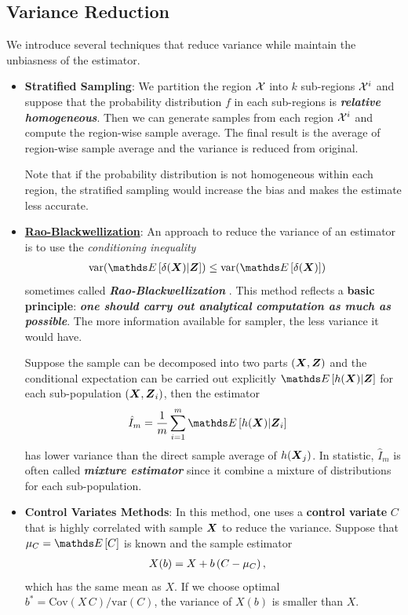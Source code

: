 \documentclass[11pt]{article}
\begin{document}
\subsection{Variance Reduction}
We introduce several techniques that reduce variance while maintain the unbiasness of the estimator.
\begin{itemize}
\item \textbf{Stratified Sampling}: We partition the region ${\mathcal X}$ into $k$ sub-regions ${\mathcal X}^{i}$ and suppose that the probability distribution $f$ in each sub-regions is \emph{\textbf{relative homogeneous}}. Then we can generate samples from each region ${\mathcal X}^{i}$ and compute the region-wise sample average. The final result is the average of region-wise sample average and the variance is reduced from original. 

Note that if the probability distribution is not homogeneous within each region, the stratified sampling would increase the bias and makes the estimate less accurate.

\item \underline{\textbf{Rao-Blackwellization}}: An approach to reduce the variance of an estimator is to use the \emph{conditioning inequality}
\begin{align}
\text{var}(\E{}{\delta(\mb{X})|\mb{Z}}) &\le \text{var}(\E{}{\delta(\mb{X})}) \label{eqn: rao_blackwell}
\end{align} sometimes called \textbf{\emph{Rao-Blackwellization}} \citep{liu2001monte}. This method reflects a \textbf{basic principle}: \emph{\textbf{one should carry out analytical computation as much as possible}}. The more information available for sampler, the less variance it would have. 

Suppose the sample can be decomposed into two parts $(\boldsymbol{X}, \boldsymbol{Z})$ and the conditional expectation can be carried out explicitly $\E{}{h(\mb{X}) | \mb{Z}}$ for each sub-population $(\boldsymbol{X}, \boldsymbol{Z}_i)$, then the estimator 
\begin{align*}
\hat{I}_{m} &= \frac{1}{m}\sum_{i=1}^{m}\E{}{h(\mb{X}) | \mb{Z}_{i}}
\end{align*} has lower variance than the direct sample average of $h(\boldsymbol{X}_{j})$. In statistic, $\hat{I}_{m}$ is often called \emph{\textbf{mixture estimator}} since it combine a mixture of distributions for each sub-population.

\item \textbf{Control Variates Methods}: In this method, one uses a \textbf{control variate} $C$ that is highly correlated with sample $\boldsymbol{X}$ to reduce the variance. Suppose that $\mu_{C} = \E{}{C}$ is known and the sample estimator
\begin{align*}
X(b) &= X + b\left(C - \mu_{C}\right),
\end{align*} which has the same mean as $X$. If we choose optimal $b^{*} = \text{Cov}(X\,C)/\text{var}(C)$, the variance of $X(b)$ is smaller than $X$.


\end{itemize}
\end{document}
